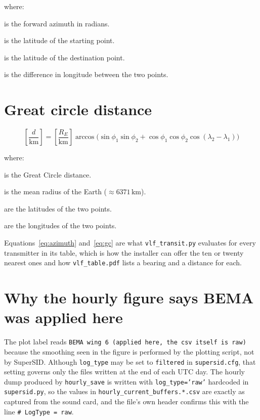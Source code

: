 \documentclass[11pt,a4paper]{article}
\begin{document}
where:
\begin{description}[itemsep=2pt,topsep=2pt]
    \item[$-$ $\theta$] is the forward azimuth in radians.
    \item[$-$ $\phi_1$] is the latitude of the starting point.
    \item[$-$ $\phi_2$] is the latitude of the destination point.
    \item[$-$ $\Delta\lambda$] is the difference in longitude between the two points.
\end{description}

\section{Great circle distance}

{\small
\begin{equation}
    \left [\frac{d}{\mathrm{km}} \right]= \left[ \frac{R_{E}}{\mathrm{km}} \right] \arccos\big(\sin\phi_{1}\sin\phi_{2} + \cos\phi_{1}\cos\phi_{2}\cos(\lambda_{2}-\lambda_{1})\big)
    \label{eq:gc}
\end{equation}
}

where:
\begin{description}[itemsep=2pt,topsep=2pt]
    \item[$-$ $d$] is the Great Circle distance.
    \item[$-$ $R_{E}$] is the mean radius of the Earth ($\approx 6371 \, \mathrm{km}$).
    \item[$-$ $\phi_{1}, \phi_{2}$] are the latitudes of the two points.
    \item[$-$ $\lambda_{1}, \lambda_{2}$] are the longitudes of the two points.
\end{description}

Equations~\ref{eq:azimuth} and~\ref{eq:gc} are what \texttt{vlf\_transit.py}
evaluates for every transmitter in its table, which is how the installer can
offer the ten or twenty nearest ones and how \texttt{vlf\_table.pdf} lists a
bearing and a distance for each.

\section{Why the hourly figure says BEMA was applied here}

The plot label reads \texttt{BEMA wing 6 (applied here, the csv itself is raw)}
because the smoothing seen in the figure is performed by the plotting script,
not by SuperSID. Although \texttt{log\_type} may be set to \texttt{filtered} in
\texttt{supersid.cfg}, that setting governs only the files written at the end of
each UTC day. The hourly dump produced by \texttt{hourly\_save} is written with
\texttt{log\_type='raw'} hardcoded in \texttt{supersid.py}, so the values in
\texttt{hourly\_current\_buffers.*.csv} are exactly as captured from the sound
card, and the file's own header confirms this with the line
\texttt{\# LogType = raw}.
\end{document}

